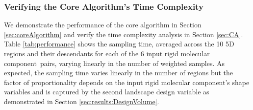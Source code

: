 \documentclass[]{article}
\newcommand{\rmc}{rigid molecular component}
\begin{document}
\subsubsection{Verifying the Core Algorithm's Time Complexity}
\label{sec:results:coreComplexity}
We demonstrate the performance of the core algorithm in Section
\ref{sec:coreAlgorithm} and verify the time complexity analysis in Section
\ref{sec:CA}. Table \ref{tab:performance} shows the sampling time, averaged
across the 10 5D regions and their descendants for each of the 6 input \rmc\
pairs, varying linearly in the number of weighted samples. As expected, the
sampling time varies linearly in the number of regions but the factor of
proportionality depends on the input \rmc 's shape variables and is captured
by the second landscape design variable as demonstrated in Section
\ref{sec:results:DesignVolume}.
\end{document}
